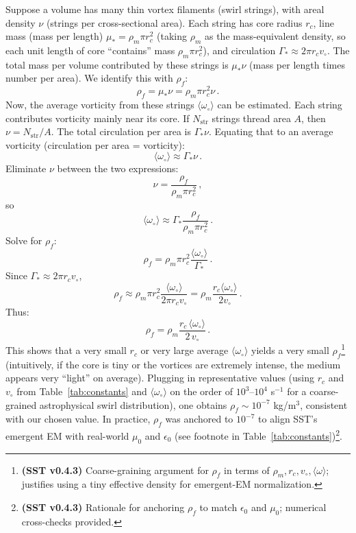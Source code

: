 \documentclass[reprint,aps,onecolumn,nofootinbib]{revtex4-2}
\begin{document}
    Suppose a volume has many thin vortex filaments (swirl strings), with areal density $\nu$ (strings per cross-sectional area). Each string has core radius $r_c$, line mass (mass per length) $\mu_* = \rho_m \pi r_c^2$ (taking $\rho_m$ as the mass-equivalent density, so each unit length of core “contains” mass $\rho_m \pi r_c^2$), and circulation $\Gamma_* \approx 2\pi r_c v_{\circ}$. The total mass per volume contributed by these strings is $\mu_*\nu$ (mass per length times number per area). We identify this with $\rho_f$:
    \[
        \rho_f = \mu_* \nu = \rho_m \pi r_c^2 \nu\,.
    \]
    Now, the average vorticity from these strings $\langle \omega_{\circ}\rangle$ can be estimated. Each string contributes vorticity mainly near its core. If $N_{\text{str}}$ strings thread area $A$, then $\nu = N_{\text{str}}/A$. The total circulation per area is $\Gamma_* \nu$. Equating that to an average vorticity (circulation per area = vorticity):
    \[
        \langle \omega_{\circ} \rangle \approx \Gamma_* \nu\,.
    \]
    Eliminate $\nu$ between the two expressions:
    \[
        \nu = \frac{\rho_f}{\rho_m \pi r_c^2}\,,
    \]
    so
    \[
        \langle \omega_{\circ} \rangle \approx \Gamma_* \frac{\rho_f}{\rho_m \pi r_c^2}\,.
    \]
    Solve for $\rho_f$:
    \[
        \rho_f = \rho_m \pi r_c^2 \frac{\langle \omega_{\circ}\rangle}{\Gamma_*}\,.
    \]
    Since $\Gamma_* \approx 2\pi r_c v_{\circ}$,
    \[
        \rho_f \approx \rho_m \pi r_c^2 \frac{\langle \omega_{\circ}\rangle}{2\pi r_c v_{\circ}} = \rho_m \frac{r_c \langle \omega_{\circ}\rangle}{2 v_{\circ}}\,.
    \]
    Thus:
    \[
        \rho_f = \rho_m \frac{r_c\,\langle \omega_{\circ}\rangle}{2\,v_{\circ}}\,.
    \]
    This shows that a very small $r_c$ or very large average $\langle \omega_{\circ}\rangle$ yields a very small $\rho_f$\footnote{\textbf{(SST v0.4.3)} Coarse-graining argument for $\rho_f$ in terms of $\rho_m, r_c, v_{\circ}, \langle\omega\rangle$; justifies using a tiny effective density for emergent-EM normalization.} (intuitively, if the core is tiny or the vortices are extremely intense, the medium appears very “light” on average). Plugging in representative values (using $r_c$ and $v_{\circ}$ from Table~\ref{tab:constants} and $\langle \omega_{\circ}\rangle$ on the order of $10^3$–$10^4$ s$^{-1}$ for a coarse-grained astrophysical swirl distribution), one obtains $\rho_f \sim 10^{-7}$ kg/m$^3$, consistent with our chosen value. In practice, $\rho_f$ was anchored to $10^{-7}$ to align SST’s emergent EM with real-world $\mu_0$ and $\epsilon_0$ (see footnote in Table~\ref{tab:constants})\footnote{\textbf{(SST v0.4.3)} Rationale for anchoring $\rho_f$ to match $\epsilon_0$ and $\mu_0$; numerical cross-checks provided.}.
\end{document}
